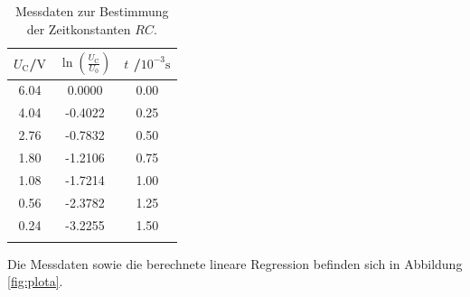 \begin{table}
	\caption{Messdaten zur Bestimmung der Zeitkonstanten $RC$.}
	\label{tab:taba}
	\centering
	\begin{tabular}{ccc}
		\toprule
		$U_\text{C}$/$\si{\volt}$ & $\ln{(\frac{U_\text{C}}{U_\text{0}})}$ & $t$ /$10^{-3}\si{\second}$ \\
		\midrule
		6.04                      & 0.0000                                 & 0.00                       \\
		4.04                      & -0.4022                                & 0.25                       \\
		2.76                      & -0.7832                                & 0.50                       \\
		1.80                      & -1.2106                                & 0.75                       \\
		1.08                      & -1.7214                                & 1.00                       \\
		0.56                      & -2.3782                                & 1.25                       \\
		0.24                      & -3.2255                                & 1.50                       \\                    \\
		\bottomrule
	\end{tabular}
\end{table}
Die Messdaten sowie die berechnete lineare Regression befinden sich in Abbildung \ref{fig:plota}.

